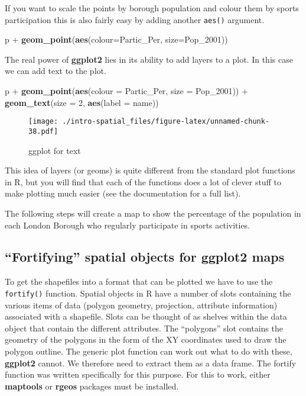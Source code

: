 \documentclass[]{article}
\newenvironment{Shaded}{}{}
\newcommand{\KeywordTok}[1]{\textcolor[rgb]{0.00,0.44,0.13}{\textbf{{#1}}}}
\newcommand{\DataTypeTok}[1]{\textcolor[rgb]{0.56,0.13,0.00}{{#1}}}
\newcommand{\DecValTok}[1]{\textcolor[rgb]{0.25,0.63,0.44}{{#1}}}
\newcommand{\StringTok}[1]{\textcolor[rgb]{0.25,0.44,0.63}{{#1}}}
\newcommand{\NormalTok}[1]{{#1}}
\begin{document}
If you want to scale the points by borough population and colour them by
sports participation this is also fairly easy by adding another
\texttt{aes()} argument.

\begin{Shaded}
\begin{Highlighting}[]
\NormalTok{p +}\StringTok{ }\KeywordTok{geom_point}\NormalTok{(}\KeywordTok{aes}\NormalTok{(}\DataTypeTok{colour=}\NormalTok{Partic_Per, }\DataTypeTok{size=}\NormalTok{Pop_2001))}
\end{Highlighting}
\end{Shaded}

The real power of \textbf{ggplot2} lies in its ability to add layers to
a plot. In this case we can add text to the plot.

\begin{Shaded}
\begin{Highlighting}[]
\NormalTok{p +}\StringTok{ }\KeywordTok{geom_point}\NormalTok{(}\KeywordTok{aes}\NormalTok{(}\DataTypeTok{colour =} \NormalTok{Partic_Per, }\DataTypeTok{size =} \NormalTok{Pop_2001)) +}\StringTok{ }\KeywordTok{geom_text}\NormalTok{(}\DataTypeTok{size =} \DecValTok{2}\NormalTok{, }\KeywordTok{aes}\NormalTok{(}\DataTypeTok{label =} \NormalTok{name))}
\end{Highlighting}
\end{Shaded}

\begin{figure}[htbp]
\centering
\texttt{[image: ./intro-spatial\_files/figure-latex/unnamed-chunk-38.pdf]}
\caption{ggplot for text}
\end{figure}

This idea of layers (or geoms) is quite different from the standard plot
functions in R, but you will find that each of the functions does a lot
of clever stuff to make plotting much easier (see the documentation for
a full list).

The following steps will create a map to show the percentage of the
population in each London Borough who regularly participate in sports
activities.

\subsection{``Fortifying'' spatial objects for ggplot2
maps}\label{fortifying-spatial-objects-for-ggplot2-maps}

To get the shapefiles into a format that can be plotted we have to use
the \texttt{fortify()} function. Spatial objects in R have a number of
slots containing the various items of data (polygon geometry,
projection, attribute information) associated with a shapefile. Slots
can be thought of as shelves within the data object that contain the
different attributes. The ``polygons'' slot contains the geometry of the
polygons in the form of the XY coordinates used to draw the polygon
outline. The generic plot function can work out what to do with these,
\textbf{ggplot2} cannot. We therefore need to extract them as a data
frame. The fortify function was written specifically for this purpose.
For this to work, either \textbf{maptools} or \textbf{rgeos} packages
must be installed.
\end{document}
